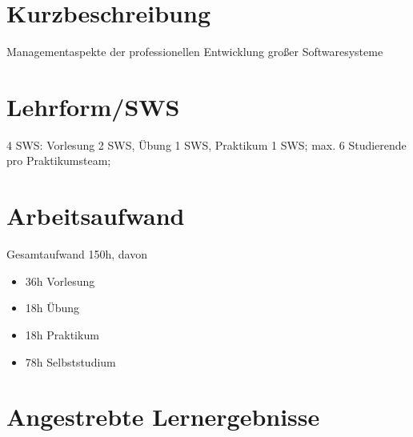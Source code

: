\hypertarget{kurzbeschreibungpathlabelmi-2017modulbeschreibungen-bachelorba_projektmanagement}{%
\section*{Kurzbeschreibung\label{/mi-2017/modulbeschreibungen-bachelor/BA_Projektmanagement}}\label{kurzbeschreibungpathlabelmi-2017modulbeschreibungen-bachelorba_projektmanagement}}

Managementaspekte der professionellen Entwicklung großer Softwaresysteme

\hypertarget{lehrformswspathlabelmi-2017modulbeschreibungen-bachelorba_projektmanagement}{%
\section*{Lehrform/SWS\label{/mi-2017/modulbeschreibungen-bachelor/BA_Projektmanagement}}\label{lehrformswspathlabelmi-2017modulbeschreibungen-bachelorba_projektmanagement}}

4 SWS: Vorlesung 2 SWS, Übung 1 SWS, Praktikum 1 SWS; max. 6 Studierende
pro Praktikumsteam;

\hypertarget{arbeitsaufwandpathlabelmi-2017modulbeschreibungen-bachelorba_projektmanagement}{%
\section*{Arbeitsaufwand\label{/mi-2017/modulbeschreibungen-bachelor/BA_Projektmanagement}}\label{arbeitsaufwandpathlabelmi-2017modulbeschreibungen-bachelorba_projektmanagement}}

Gesamtaufwand 150h, davon

\begin{itemize}
\tightlist
\item
  36h Vorlesung
\item
  18h Übung
\item
  18h Praktikum
\item
  78h Selbststudium
\end{itemize}

\hypertarget{angestrebte-lernergebnissepathlabelmi-2017modulbeschreibungen-bachelorba_projektmanagement}{%
\section*{Angestrebte
Lernergebnisse\label{/mi-2017/modulbeschreibungen-bachelor/BA_Projektmanagement}}\label{angestrebte-lernergebnissepathlabelmi-2017modulbeschreibungen-bachelorba_projektmanagement}}

